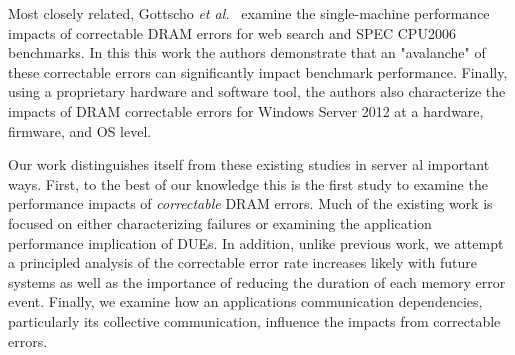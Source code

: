 Most closely related, Gottscho {\it et al.}~\cite{Gottscho:2017:Measuring}
examine the single-machine performance impacts of correctable DRAM errors for
web search and SPEC CPU2006 benchmarks.  In this this work the authors
demonstrate that an "avalanche" of these correctable errors can significantly
impact benchmark performance.  Finally, using a proprietary hardware and
software tool, the authors also characterize the impacts of DRAM correctable
errors for Windows Server 2012 at a hardware, firmware, and OS level.

Our work distinguishes itself from these existing studies in server al important
ways.  First, to the best of our knowledge this is the first study to examine
the performance impacts of \emph{correctable} DRAM errors.  Much of the existing
work is focused on either characterizing failures or examining the application
performance implication of DUEs. In addition, unlike previous work, we attempt a
principled analysis of the correctable error rate increases likely with future
systems as well as the importance of reducing the duration of each memory error
event.  Finally, we examine how an applications communication dependencies,
particularly its collective communication, influence the impacts from correctable
errors.

